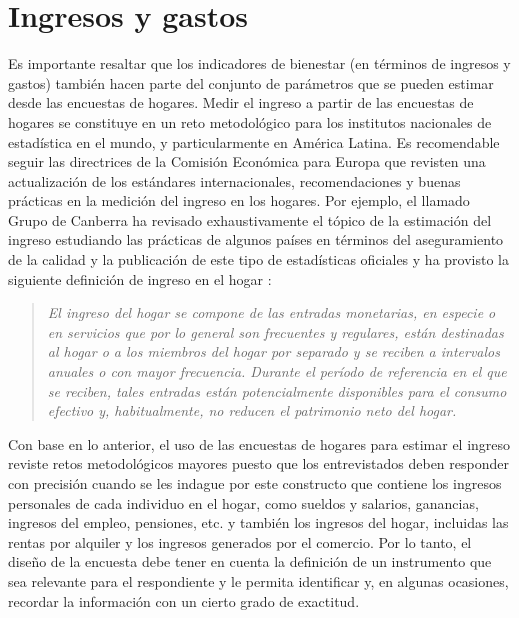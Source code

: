 \documentclass[
  12pt,
  spanish,
]{book}
\begin{document}
\hypertarget{ingresos-y-gastos}{%
\section{Ingresos y gastos}\label{ingresos-y-gastos}}

Es importante resaltar que los indicadores de bienestar (en términos de ingresos y gastos) también hacen parte del conjunto de parámetros que se pueden estimar desde las encuestas de hogares. Medir el ingreso a partir de las encuestas de hogares se constituye en un reto metodológico para los institutos nacionales de estadística en el mundo, y particularmente en América Latina. Es recomendable seguir las directrices de la Comisión Económica para Europa que revisten una actualización de los estándares internacionales, recomendaciones y buenas prácticas en la medición del ingreso en los hogares. Por ejemplo, el llamado Grupo de Canberra ha revisado exhaustivamente el tópico de la estimación del ingreso estudiando las prácticas de algunos países en términos del aseguramiento de la calidad y la publicación de este tipo de estadísticas oficiales y ha provisto la siguiente definición de ingreso en el hogar \citep{United-Nations_2011}:

\begin{quote}
\emph{El ingreso del hogar se compone de las entradas monetarias, en especie o en servicios que por lo general son frecuentes y regulares, están destinadas al hogar o a los miembros del hogar por separado y se reciben a intervalos anuales o con mayor frecuencia. Durante el período de referencia en el que se reciben, tales entradas están potencialmente disponibles para el consumo efectivo y, habitualmente, no reducen el patrimonio neto del hogar.}
\end{quote}

Con base en lo anterior, el uso de las encuestas de hogares para estimar el ingreso reviste retos metodológicos mayores puesto que los entrevistados deben responder con precisión cuando se les indague por este constructo que contiene los ingresos personales de cada individuo en el hogar, como sueldos y salarios, ganancias, ingresos del empleo, pensiones, etc. y también los ingresos del hogar, incluidas las rentas por alquiler y los ingresos generados por el comercio. Por lo tanto, el diseño de la encuesta debe tener en cuenta la definición de un instrumento que sea relevante para el respondiente y le permita identificar y, en algunas ocasiones, recordar la información con un cierto grado de exactitud.
\end{document}
